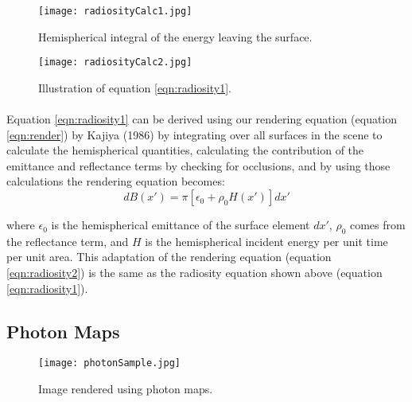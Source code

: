 \begin{figure}[h!]
  \centering
    \texttt{[image: radiosityCalc1.jpg]}
  \caption{Hemispherical integral of the energy leaving the surface.}
	\label{fig:radiosityCalc1}
\end{figure}

\begin{figure}[h!]
  \centering
    \texttt{[image: radiosityCalc2.jpg]}
  \caption{Illustration of equation \ref{eqn:radiosity1}.}
	\label{fig:radiosityCalc2}
\end{figure}

\paragraph{}
Equation \ref{eqn:radiosity1} can be derived using our rendering equation (equation \ref{eqn:render}) by Kajiya (1986) by integrating over all surfaces in the scene to calculate the hemispherical quantities, calculating the contribution of the emittance and reflectance terms by checking for occlusions, and by using those calculations the rendering equation becomes:
\begin{equation}
dB(x') = \pi[\epsilon_{0} + \rho_{0}H(x')]dx' \label{eqn:radiosity2}
\end{equation}

where $\epsilon_{0}$ is the hemispherical emittance of the surface element $dx'$, $\rho_{0}$ comes from the reflectance term, and $H$ is the hemispherical incident energy per unit time per unit area.  This adaptation of the rendering equation (equation \ref{eqn:radiosity2}) is the same as the radiosity equation shown above (equation \ref{eqn:radiosity1}).

\subsection{Photon Maps}

\begin{figure}[h!]
  \centering
    \texttt{[image: photonSample.jpg]}
  \caption{Image rendered using photon maps.}
	\label{fig:photonSample}
\end{figure}

